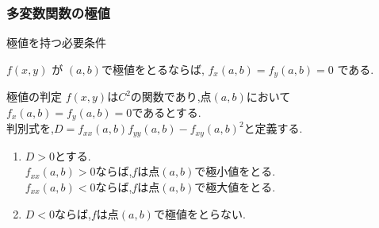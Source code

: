 \documentclass[a4paper]{jsarticle}
\begin{document}
\subsubsection{多変数関数の極値}
\begin{itembox}[l]{極値を持つ必要条件}
    \begin{center}
        $f\left(x,y\right)$ が $\left(a,b\right)$で極値をとるならば,
        $f_x\left(a,b\right)=f_y\left(a,b\right)=0$ である.
    \end{center}
\end{itembox}
\begin{itembox}[l]{極値の判定}
    $f\left(x,y\right)$は$C^2$の関数であり,点$\left(a,b\right)$において
    $f_x\left(a,b\right)=f_y\left(a, b\right)=0$であるとする.\\
    判別式を,$D=f_{xx}\left(a,b\right)f_{yy}\left(a,b\right)-{f_{xy}(a,b)}^2$と定義する.
    \begin{enumerate}[(1)]
        \item $D>0$とする.\\
              $f_{xx}\left(a,b\right)>0$ならば,$f$は点$\left(a,b\right)$で極小値をとる.\\
              $f_{xx}\left(a,b\right)<0$ならば,$f$は点$\left(a,b\right)$で極大値をとる.
        \item $D<0$ならば,$f$は点$\left(a,b\right)$で極値をとらない.
    \end{enumerate}
\end{itembox}
\end{document}
